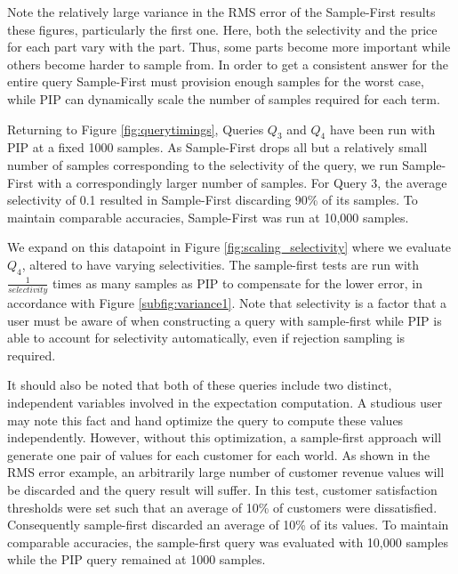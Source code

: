 Note the relatively large variance in the RMS error of the Sample-First results these figures, particularly the first one.  Here, both the selectivity and the price for each part vary with the part.   Thus, some parts become more important while others become harder to sample from.  In order to get a consistent answer for the entire query Sample-First must provision enough samples for the worst case, while PIP can dynamically scale the number of samples required for each term.

Returning to Figure \ref{fig:querytimings}, Queries $Q_3$ and $Q_4$ have been run with PIP at a fixed 1000 samples.  As Sample-First drops all but a relatively small number of samples corresponding to the selectivity of the query, we run Sample-First with a correspondingly larger number of samples.  For Query 3, the average selectivity of 0.1 resulted in Sample-First discarding 90\% of its samples.  To maintain comparable accuracies, Sample-First was run at 10,000 samples.  

We expand on this datapoint in Figure \ref{fig:scaling_selectivity} where we evaluate $Q_4$, altered to have varying selectivities.  The sample-first tests are run with $\frac{1}{selectivity}$ times as many samples as PIP to compensate for the lower error, in accordance with Figure \ref{subfig:variance1}.  Note that selectivity is a factor that a user must be aware of when constructing a query with sample-first while PIP is able to account for selectivity automatically, even if rejection sampling is required.

It should also be noted that both of these queries include two distinct, independent variables involved in the expectation computation.  A studious user may note this fact and hand optimize the query to compute these values independently.  However, without this optimization, a sample-first approach will generate one pair of values for each customer for each world.  As shown in the RMS error example, an arbitrarily large number of customer revenue values will be discarded and the query result will suffer.  In this test, customer satisfaction thresholds were set such that an average of 10\% of customers were dissatisfied.  Consequently sample-first discarded an average of 10\% of its values.  To maintain comparable accuracies, the sample-first query was evaluated with 10,000 samples while the PIP query remained at 1000 samples. 

